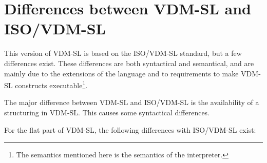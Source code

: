 \documentclass[\pformat,12pt]{article}
\newcommand{\vdmslpp}[2]{%
#1
}
\newcommand{\vdmsl}{VDM-SL}
\newcommand{\vdmpp}{VDM++}
\begin{document}
\section{Differences between  VDM-SL
         and\\      ISO/VDM-SL}\label{diff}

This version of  \vdmslpp{\vdmsl}{\vdmpp} is based on 
the ISO/VDM-SL standard, but a few differences exist. These
differences are both syntactical and semantical, and are mainly due to
the extensions of the language and to requirements to make 
\vdmslpp{\vdmsl}{\vdmpp} constructs executable\footnote{The semantics
mentioned here is the semantics of the interpreter.}.

The major difference between  {\vdmsl} and
ISO/VDM-SL is the availability of a structuring in  VDM-SL. This
causes some syntactical differences.

For the flat part of  VDM-SL, the following differences with ISO/VDM-SL
exist:
\end{document}
